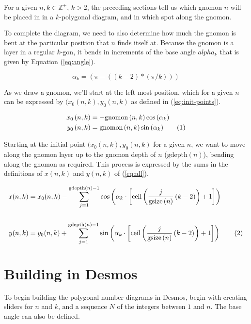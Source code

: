\documentclass[notitlepage]{report}
\newcommand\numberthis{\addtocounter{equation}{1}\tag{\theequation}}
\begin{document}
For a given $n,k \in \mathbb{Z}^{+}$, $k > 2$, the preceding sections tell us which gnomon $n$ will be placed in in a $k$-polygonal diagram, and in which spot along the gnomon. 

To complete the diagram, we need to also determine how much the gnomon is bent at the particular position that $n$ finds itself at. Because the gnomon is a layer in a regular $k$-gon, it bends in increments of the base angle $alpha_k$ that is given by Equation (\ref{eq:angle}).


\begin{equation}
    \alpha_k=\left(\pi-((k-2)*(\pi/k))\right)
\label{eq:angle}
\end{equation}

As we draw a gnomon, we'll start at the left-most position, which for a given $n$ can be expressed by $(x_0(n,k),y_0(n,k)$ as defined in (\ref{eq:init-points}).

\begin{align*}
    x_0\left(n,k\right) &= -\text{gnomon}\left(n,k\right)\cos{(\alpha_k)} \\
    y_0\left(n,k\right) &=
    \text{gnomon}\left(n,k\right)\sin{(\alpha_k)} 
    \numberthis
    \label{eq:init-points}
\end{align*}

Starting at the initial point $(x_0(n,k),y_0(n,k)$ for a given $n$, we want to move along the gnomon layer up to the gnomon depth of $n$ ($\text{gdepth}(n)$), bending along the gnomon as required. This process is expressed by the sums in the definitions of $x(n,k)$ and $y(n,k)$ of (\ref{eq:all}).

\begin{align*}
x(n,k) &= x_0(n,k) - \sum_{j=1}^{\text{gdepth}\left(n\right)-1}\cos\left(\alpha_{k}\cdot\left[\operatorname{ceil}\left(\frac{j}{\text{gsize}\left(n\right)}\left(k-2\right)\right)+1\right]\right)\\
\\
y(n,k) &= y_0(n,k) + \sum_{j=1}^{\text{gdepth}\left(n\right)-1}\sin\left(\alpha_k\cdot\left[\operatorname{ceil}\left(\frac{j}{\text{gsize}\left(n\right)}\left(k-2\right)\right)+1\right]\right)
\numberthis
\label{eq:all}
\end{align*}

\section*{Building in Desmos}

To begin building the polygonal number diagrams in Desmos\cite{desmos}, begin with creating sliders for $n$ and $k$, and a sequence $N$ of the integers between $1$ and $n$. The base angle can also be defined.
\end{document}

